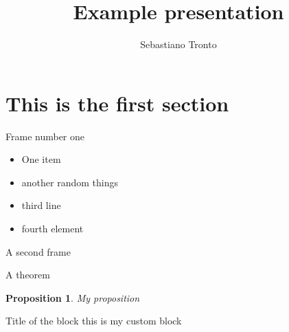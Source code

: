 \documentclass[11pt]{beamer}
\author[Tronto]{Sebastiano Tronto}
\title[Example]{Example presentation}
\newtheorem{prop}{Proposition}
\begin{document}
\begin{frame}
\titlepage
\end{frame}


\section[this]{This is the first section}

\begin{frame}{Frame number one}

\begin{itemize}[<+->]
\item One item
\item another random things
\item third line
\item fourth element
\end{itemize}
\end{frame}

\begin{frame}{A second frame}
\begin{theorem}
A theorem
\end{theorem}

{

\begin{prop}
My proposition
\end{prop}
}

\begin{block}{Title of the block}
this is my custom block
\end{block}

\end{frame}
\end{document}
